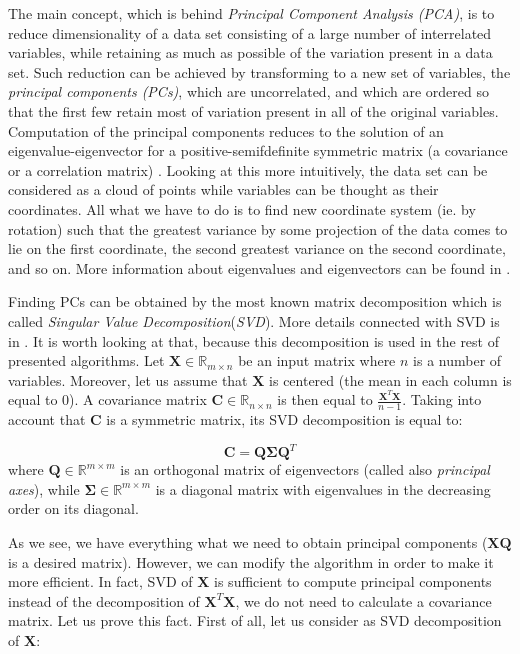 The main concept, which is behind \textit{Principal Component Analysis (PCA)}, is to reduce dimensionality of a data set consisting of a large number of interrelated variables, while retaining as much as possible of the variation present in a data set. Such reduction can be achieved by transforming to a new set of variables, the \textit{principal components (PCs)}, which are uncorrelated, and which are ordered so that the first few retain most of variation present in all of the original variables. Computation of the principal components reduces to the solution of an eigenvalue-eigenvector for a positive-semifdefinite symmetric matrix (a covariance or a correlation matrix) \citep{Jolliffe}. Looking at this more intuitively, the data set can be considered as a cloud of points while variables can be thought as their coordinates. All what we have to do is to find new coordinate system (ie. by rotation) such that the greatest variance by some projection of the data comes to lie on the first coordinate, the second greatest variance on the second coordinate, and so on. More information about eigenvalues and eigenvectors can be found in . 

Finding PCs can be obtained by the most known matrix decomposition which is called \textit{Singular Value Decomposition}(\textit{SVD}). More details connected with SVD is in . It is worth looking at that, because this decomposition is used in the rest of presented algorithms. Let $\boldsymbol{X} \in \mathbb{R}_{m \times n}$ be an input matrix where $n$ is a number of variables. Moreover, let us assume that $\boldsymbol{X}$ is centered (the mean in each column is equal to $0$). A covariance matrix $\boldsymbol{C} \in \mathbb{R}_{n \times n}$ is then equal to $\frac{\boldsymbol{X}^T\boldsymbol{X}}{n-1}$. Taking into account that $\boldsymbol{C}$ is a symmetric matrix, its SVD decomposition is equal to:

\begin{equation}\label{eq:pca1}
    \boldsymbol{C}=\boldsymbol{Q}\boldsymbol{\Sigma}{\boldsymbol{Q}^T}
\end{equation}
where $\boldsymbol{Q} \in \mathbb{R}^{m \times m}$ is an orthogonal matrix of eigenvectors (called also \textit{principal axes}), while $\boldsymbol{\Sigma} \in \mathbb{R}^{m \times m}$ is a diagonal matrix with eigenvalues in the decreasing order on its diagonal. 

As we see, we have everything what we need to obtain principal components ($\boldsymbol{X}\boldsymbol{Q}$ is a desired matrix). However, we can modify the algorithm in order to make it more efficient. In fact, SVD of $\boldsymbol{X}$ is sufficient to compute principal components instead of the decomposition of $\boldsymbol{X}^T\boldsymbol{X}$, we do not need to calculate a covariance matrix. Let us prove this fact. First of all, let us consider as SVD decomposition of $\boldsymbol{X}$:

